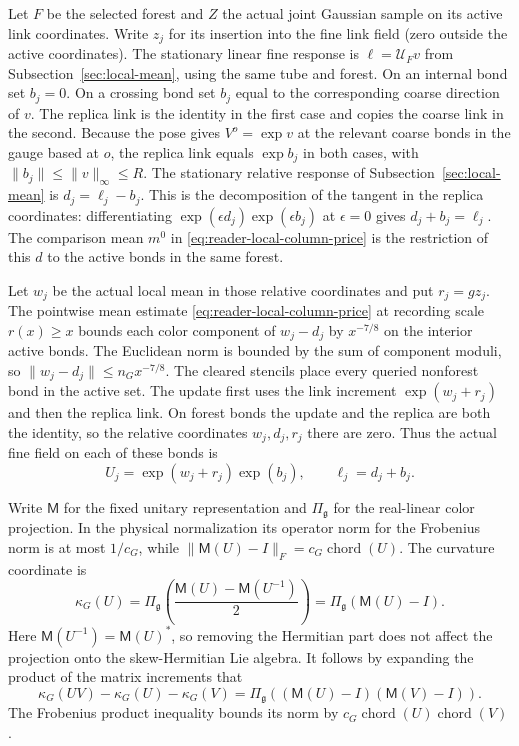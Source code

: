 Let $F$ be the selected forest and $Z$ the actual joint Gaussian sample on
its active link coordinates. Write $z_j$ for its insertion into the fine
link field (zero outside the active coordinates). The stationary linear
fine response is $\ell=\mathcal U_Fv$ from Subsection~\ref{sec:local-mean},
using the same tube and forest.
On an internal bond set $b_j=0$. On a crossing bond set $b_j$ equal to the
corresponding coarse direction of $v$. The replica link is the identity
in the first case and copies the coarse link in the second. Because the
pose gives $V^o=\exp v$ at the relevant coarse bonds in the gauge based at
$o$, the replica link equals $\exp b_j$ in both cases, with
$\|b_j\|\le\|v\|_\infty\le R$. The stationary relative response of Subsection~\ref{sec:local-mean} is
$d_j=\ell_j-b_j$. This is the decomposition of the tangent in the
replica coordinates: differentiating $\exp(\epsilon d_j)\exp(\epsilon b_j)$
at $\epsilon=0$ gives $d_j+b_j=\ell_j$. The comparison mean
$m^0$ in \eqref{eq:reader-local-column-price} is the restriction of this $d$
to the active bonds in the same forest.

Let $w_j$ be the actual local mean in those relative coordinates and put
$r_j=gz_j$. The pointwise mean estimate
\eqref{eq:reader-local-column-price} at recording scale $r(x)\ge x$ bounds
each color component of $w_j-d_j$ by $x^{-7/8}$ on the interior active
bonds. The Euclidean norm is bounded by the sum of component moduli, so
$\|w_j-d_j\|\le n_Gx^{-7/8}$. The cleared stencils place every queried nonforest bond in the active set.
The update first uses the link increment $\exp(w_j+r_j)$ and then the
replica link. On forest bonds the update and the replica are both the
identity, so the relative coordinates $w_j,d_j,r_j$ there are zero. Thus the
actual fine field on each of these bonds is
\begin{equation}\label{eq:readerB-fine-link}
 U_j=\exp(w_j+r_j)\exp(b_j),\qquad \ell_j=d_j+b_j.
\end{equation}

Write $\mathsf M$ for the fixed unitary representation and
$\Pi_{\mathfrak g}$ for the real-linear color projection. In the physical
normalization its operator norm for the Frobenius norm is at most $1/c_G$,
while $\|\mathsf M(U)-I\|_F=c_G\operatorname{chord}(U)$.
The curvature coordinate is
\[
 \kappa_G(U)=\Pi_{\mathfrak g}\!\left(
       \frac{\mathsf M(U)-\mathsf M(U^{-1})}{2}\right)
             =\Pi_{\mathfrak g}(\mathsf M(U)-I).
\]
Here $\mathsf M(U^{-1})=\mathsf M(U)^*$, so removing the Hermitian part
does not affect the projection onto the skew-Hermitian Lie algebra. It
follows by expanding the product of the matrix increments that
\begin{equation}\label{eq:readerB-product-defect}
 \kappa_G(UV)-\kappa_G(U)-\kappa_G(V)
   =\Pi_{\mathfrak g}((\mathsf M(U)-I)(\mathsf M(V)-I)).
\end{equation}
The Frobenius product inequality bounds its norm by
$c_G\operatorname{chord}(U)\operatorname{chord}(V)$.

